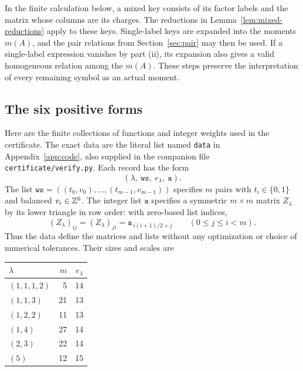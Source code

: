In the finite calculation below, a mixed key consists of its factor
labels and the matrix whose columns are its charges. The reductions in
Lemma~\ref{lem:mixed-reductions} apply to these keys. Single-label keys
are expanded into the moments $m(A)$, and the pair relations from
Section~\ref{sec:pair} may then be used. If a single-label expression
vanishes by part (ii), its expansion also gives a valid homogeneous
relation among the $m(A)$. These steps preserve the interpretation of
every remaining symbol as an actual moment.

\subsection{The six positive forms}

Here are the finite collections of functions and integer weights used
in the certificate. The exact data are the literal list named
\texttt{data} in Appendix~\ref{app:code}, also supplied in the companion
file \texttt{certificate/verify.py}. Each record has the form
\[
 (\lambda,\ \texttt{ws},\ e_\lambda,\ \texttt{a}).
\]
The list $\texttt{ws}=((t_0,v_0),\ldots,(t_{m-1},v_{m-1}))$ specifies
$m$ pairs with $t_i\in\{0,1\}$ and balanced $v_i\in\mathbb Z^6$.
The integer list $\texttt{a}$ specifies a symmetric $m\times m$ matrix
$Z_\lambda$ by its lower triangle in row order: with zero-based list
indices,
\begin{equation}\label{eq:Z-encoding}
 (Z_\lambda)_{ij}=(Z_\lambda)_{ji}
       =\texttt{a}_{\,i(i+1)/2+j}
       \qquad(0\le j\le i<m).
\end{equation}
Thus the data define the matrices and lists without any optimization or
choice of numerical tolerances. Their sizes and scales are
\begin{center}
\begin{tabular}{@{}lrr@{}}
\toprule
$\lambda$ & $m$ & $e_\lambda$\\
\midrule
$(1,1,1,2)$ & 5  & 14\\
$(1,1,3)$   & 21 & 13\\
$(1,2,2)$   & 11 & 13\\
$(1,4)$     & 27 & 14\\
$(2,3)$     & 22 & 14\\
$(5)$       & 12 & 15\\
\bottomrule
\end{tabular}
\end{center}

